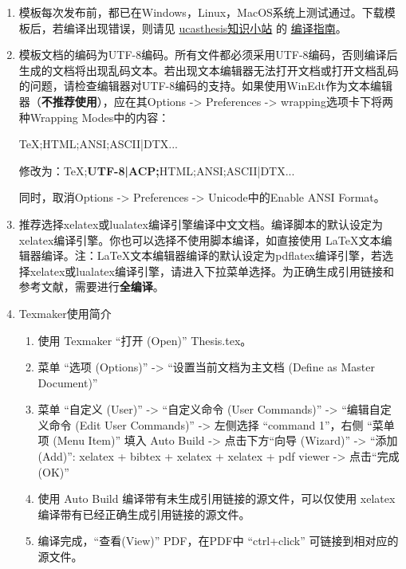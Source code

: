 \begin{enumerate}
    \item 模板每次发布前，都已在Windows，Linux，MacOS系统上测试通过。下载模板后，若编译出现错误，则请见 \href{https://github.com/mohuangrui/ucasthesis/wiki}{ucasthesis知识小站} 的 \href{https://github.com/mohuangrui/ucasthesis/wiki/%E7%BC%96%E8%AF%91%E6%8C%87%E5%8D%97}{编译指南}。

    \item 模板文档的编码为UTF-8编码。所有文件都必须采用UTF-8编码，否则编译后生成的文档将出现乱码文本。若出现文本编辑器无法打开文档或打开文档乱码的问题，请检查编辑器对UTF-8编码的支持。如果使用WinEdt作为文本编辑器（\textbf{不推荐使用}），应在其Options -> Preferences -> wrapping选项卡下将两种Wrapping Modes中的内容：

    TeX;HTML;ANSI;ASCII|DTX...

    修改为：TeX;\textbf{UTF-8|ACP;}HTML;ANSI;ASCII|DTX...

    同时，取消Options -> Preferences -> Unicode中的Enable ANSI Format。

    \item 推荐选择xelatex或lualatex编译引擎编译中文文档。编译脚本的默认设定为xelatex编译引擎。你也可以选择不使用脚本编译，如直接使用 \LaTeX{}文本编辑器编译。注：\LaTeX{}文本编辑器编译的默认设定为pdflatex编译引擎，若选择xelatex或lualatex编译引擎，请进入下拉菜单选择。为正确生成引用链接和参考文献，需要进行\textbf{全编译}。

    \item Texmaker使用简介
        \begin{enumerate}
            \footnotesize
            \item 使用 Texmaker “打开 (Open)” Thesis.tex。
            \item 菜单 “选项 (Options)” -> “设置当前文档为主文档 (Define as Master Document)”
            \item 菜单 “自定义 (User)” -> “自定义命令 (User Commands)” -> “编辑自定义命令 (Edit User Commands)” -> 左侧选择 “command 1”，右侧 “菜单项 (Menu Item)” 填入 Auto Build -> 点击下方“向导 (Wizard)” -> “添加 (Add)”: xelatex + bibtex + xelatex + xelatex + pdf viewer -> 点击“完成 (OK)”
            \item 使用 Auto Build 编译带有未生成引用链接的源文件，可以仅使用 xelatex 编译带有已经正确生成引用链接的源文件。
            \item 编译完成，“查看(View)” PDF，在PDF中 “ctrl+click” 可链接到相对应的源文件。
        \end{enumerate}


\end{enumerate}

